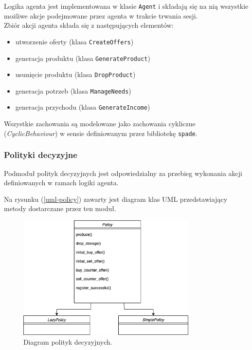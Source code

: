 \documentclass{article}
\begin{document}
Logika agenta jest implementowana w klasie \texttt{Agent} i składają się na nią wszystkie możliwe akcje podejmowane przez agenta w trakcie trwania sesji. \\
Zbiór akcji agenta składa się z następujących elementów:

\begin{itemize}

	\item utworzenie oferty (klasa \texttt{CreateOffers})
	\item generacja produktu (klasa \texttt{GenerateProduct})
	\item usunięcie produktu (klasa \texttt{DropProduct}) 
	\item generacja potrzeb (klasa \texttt{ManageNeeds})
	\item generacja przychodu (klasa \texttt{GenerateIncome})
\end{itemize}

Wszystkie zachowania są modelowane jako zachowania cykliczne (\textit{CyclicBehaviour}) w sensie definiowanym przez bibliotekę \texttt{spade}.

\subsubsection{Polityki decyzyjne}

Podmoduł polityk decyzyjnych jest odpowiedzialny za przebieg wykonania akcji definiowanych w ramach logiki agenta.

Na rysunku (\ref{uml-policy}) zawarty jest diagram 
klas UML przedstawiający metody dostarczane przez ten moduł.

\begin{figure}[H]
	\centering
	\includegraphics[width=0.8\textwidth, height=0.3\textheight]{./policy.png}
	\caption{Diagram polityk decyzyjnych.}
	\label{uml-agent}
\end{figure}
\end{document}
